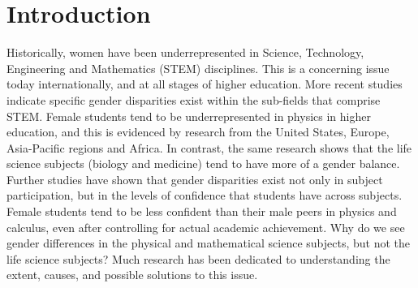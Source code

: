 \section*{Introduction}
Historically, women have been underrepresented in Science, Technology, Engineering and Mathematics (STEM) disciplines. This is a concerning issue today internationally, and at all stages of higher education.\cite{Abraham_2014,Stevanovic_2013,Smith_2011} More recent studies indicate specific gender disparities exist within the sub-fields that comprise STEM.\cite{mullis2016timss} Female students tend to be underrepresented in physics in higher education, and this is evidenced by research from the United States\cite{NSF, Cunningham_2015,Kost_Smith_2010,Heilbronner_2012}, Europe\cite{Huyer2007, Stevanovic_2013, InstituteofPhysics_2012, InstituteofPhysics_2013, Smith_2011}, Asia-Pacific regions\cite{EducationCounts_2016a, Kennedy_2014} and Africa.\cite{Semela_2010} In contrast, the same research shows that the life science subjects (biology and medicine) tend to have more of a gender balance. Further studies have shown that gender disparities exist not only in subject participation, but in the levels of confidence that students have across subjects. Female students tend to be less confident than their male peers in physics\cite{kelly2016social, Hofer_2016} and calculus\cite{Ellis_2016}, even after controlling for actual academic achievement.\cite{marshman2018female} Why do we see gender differences in the physical and mathematical science subjects, but not the life science subjects? Much research has been dedicated to understanding the extent, causes, and possible solutions to this issue.\cite{cheryan2017some,Brewe_2016, Blickenstaff_2005}

